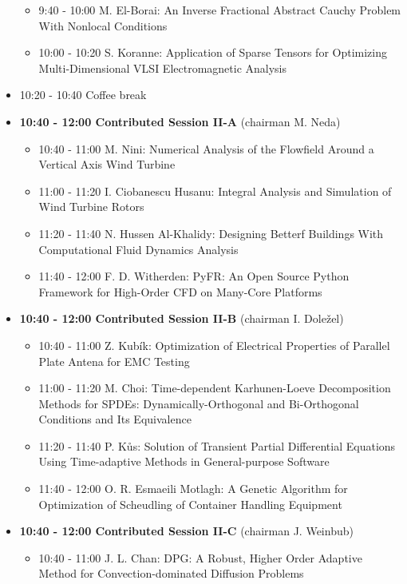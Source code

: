 \documentclass[10pt, A4]{article}%
\begin{document}
\begin{itemize}
\begin{itemize}
    \item 9:40 - 10:00 {M. El-Borai}: {An Inverse Fractional Abstract Cauchy Problem With Nonlocal Conditions} 
    \item 10:00 - 10:20 {S. Koranne}: {Application of Sparse Tensors for Optimizing Multi-Dimensional VLSI Electromagnetic Analysis}
  \end{itemize}
  \item 10:20 - 10:40 Coffee break
  \item {\bf 10:40 - 12:00 Contributed Session II-A} (chairman M. Neda) 
  \begin{itemize}
    \item 10:40 - 11:00 {M. Nini}: {Numerical Analysis of the Flowfield Around a Vertical Axis Wind Turbine}
    \item 11:00 - 11:20 {I. Ciobanescu Husanu}: {Integral Analysis and Simulation of Wind Turbine Rotors}
    \item 11:20 - 11:40 {N. Hussen Al-Khalidy}: {Designing Betterf Buildings With Computational Fluid Dynamics Analysis}
    \item 11:40 - 12:00 {F. D. Witherden}: {PyFR: An Open Source Python Framework for High-Order CFD on Many-Core Platforms}
  \end{itemize}
  \item {\bf 10:40 - 12:00 Contributed Session II-B} (chairman I. Doležel) 
  \begin{itemize}
    \item 10:40 - 11:00 {Z. Kubík}: {Optimization of Electrical Properties of Parallel Plate Antena for EMC Testing}
    \item 11:00 - 11:20 {M. Choi}: {Time-dependent Karhunen-Loeve Decomposition Methods for SPDEs: Dynamically-Orthogonal and Bi-Orthogonal Conditions and Its Equivalence}
    \item 11:20 - 11:40 {P. Kůs}: {Solution of Transient Partial Differential Equations Using Time-adaptive Methods in General-purpose Software}
    \item 11:40 - 12:00 {O. R. Esmaeili Motlagh}: {A Genetic Algorithm for Optimization of Scheudling of Container Handling Equipment}
    \end{itemize}
    \newpage
  \item {\bf 10:40 - 12:00 Contributed Session II-C} (chairman J. Weinbub) 
  \begin{itemize}
    \item 10:40 - 11:00 {J. L. Chan}: {DPG: A Robust, Higher Order Adaptive Method for Convection-dominated Diffusion Problems}

\end{itemize}
\end{itemize}
\end{document}
